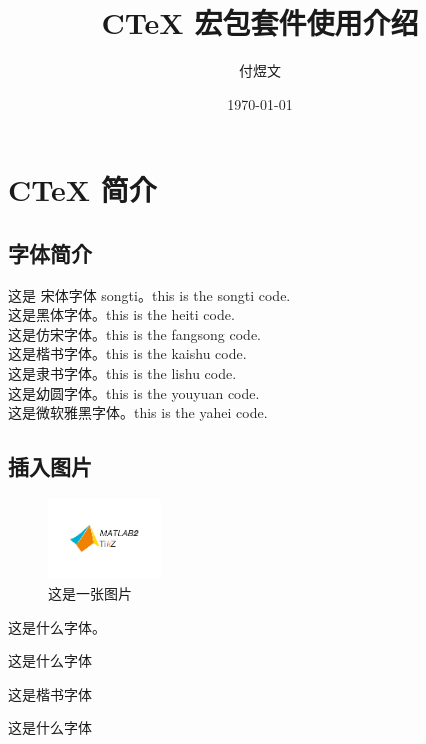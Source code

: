 \documentclass[UTF8,fontset = windows,zihao=-4,scheme=chinese,space=auto,linespread=1.25]{ctexart} %
\begin{document}
	\title{\heiti CTeX 宏包套件使用介绍}
	\author{\kaishu 付煜文}
	\date{\today}
	\maketitle
	\section{CTeX 简介}
	
	\subsection{字体简介}
	\songti 这是   宋体字体 songti。this is the songti code. \\
	\heiti	这是黑体字体。this is the heiti code.\\
	\fangsong 这是仿宋字体。this is the fangsong code.\\
	\kaishu 这是楷书字体。this is the kaishu code.
	\\
	\lishu 这是隶书字体。this is the lishu code.\\
	\youyuan 这是幼圆字体。this is the youyuan code.\\
	\yahei 这是微软雅黑字体。this is the yahei code.
	
	\subsection{插入图片}
	\begin{figure}[htb!]
		\includegraphics[width=3cm]{../logo/TikZ.png}
		\caption{这是一张图片}
		\label{fig:latex}
	\end{figure}
	这是什么字体。
	\youyuan
	
	这是什么字体
	
	\kaishu 这是楷书字体
	
	这是什么字体
	
\end{document}
